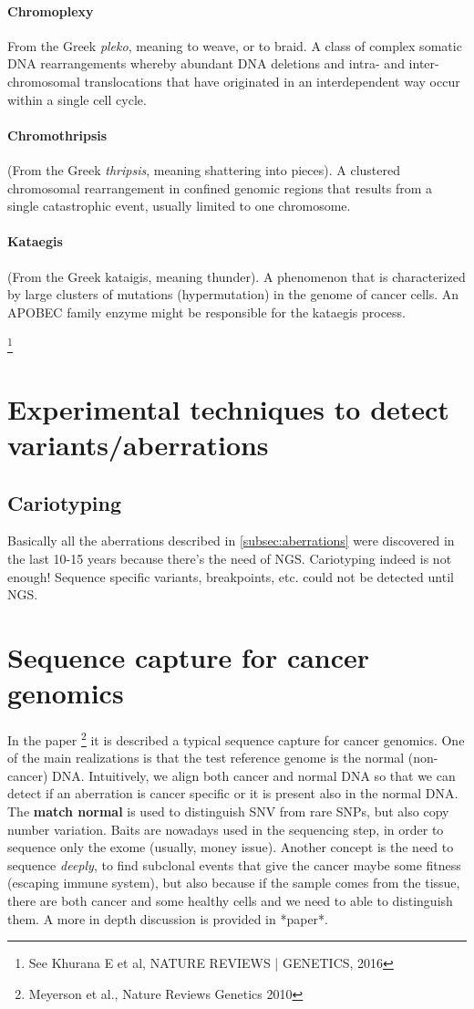 			\paragraph{Chromoplexy}
			From the Greek \textit{pleko}, meaning to weave, or to braid.
A class of complex somatic DNA rearrangements whereby abundant DNA deletions
and intra- and inter-chromosomal translocations that have originated in an
interdependent way occur within a single cell cycle. 

			\paragraph{Chromothripsis}
			(From the Greek \textit{thripsis}, meaning shattering into pieces).
A clustered chromosomal rearrangement in confined genomic regions that results
from a single catastrophic event, usually limited to one chromosome. 
			\paragraph{Kataegis}
			 (From the Greek kataigis, meaning thunder).
A phenomenon that is characterized by large clusters of mutations (hypermutation) in
the genome of cancer cells. An APOBEC family enzyme might be responsible for the
kataegis process.

\footnote{See  Khurana E et al, NATURE REVIEWS | GENETICS, 2016 }


\section{Experimental techniques to detect variants/aberrations}
\subsection{Cariotyping}
Basically all the aberrations described in \ref{subsec:aberrations} were discovered in the last 10-15 years because there's the need of NGS. 
Cariotyping indeed is not enough! 
Sequence specific variants, breakpoints, etc. could not be detected until NGS. 

\section{Sequence capture for cancer genomics}
In the paper \footnote{Meyerson et al., Nature Reviews Genetics 2010} it is described a typical sequence capture for cancer genomics. 
One of the main realizations is that the test reference genome is the normal (non-cancer) DNA. 
Intuitively, we align both cancer and normal DNA so that we can detect if an aberration is cancer specific or it is present also in the normal DNA. 
The \textbf{match normal} is used to distinguish SNV from rare SNPs, but also copy number variation. 
Baits are nowadays used in the sequencing step, in order to sequence only the exome (usually, money issue). 
Another concept is the need to sequence \textit{deeply}, to find subclonal events that give the cancer maybe some fitness (escaping immune system), but also because if the sample comes from the tissue, there are both cancer and some healthy cells and we need to able to distinguish them.
A more in depth discussion is provided in *paper*.

